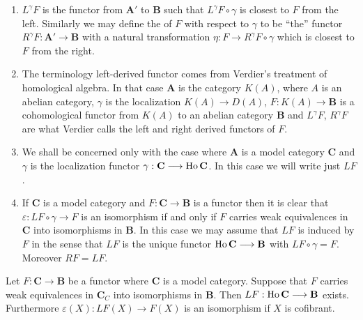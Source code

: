 \documentclass[../main]{subfiles}
\begin{document}
\begin{remark*}
\begin{enumerate}
\item $L^\gamma F$ is the functor from $\mathbf{A}'$ to $\mathbf{B}$ such that $L^\gamma F \circ \gamma$ is closest to $F$ from the left. Similarly we may define the  of $F$ with respect to $\gamma$ to be ``the'' functor $R^\gamma F : \mathbf{A}' \longrightarrow  \mathbf{B}$ with a natural transformation $\eta:F \longrightarrow  R^\gamma F \circ \gamma$ which is closest to $F$ from the right.
\item The terminology left-derived functor comes from Verdier's treatment of homological algebra\cite{verdier_categories_nodate}. In that case $\mathbf{A}$ is the category $K(A)$, where $A$ is an abelian category, $\gamma$ is the localization $K(A) \longrightarrow  D(A)$, $F: K(A)\longrightarrow  \mathbf{B}$ is a cohomological functor from $K(A)$ to an abelian category $\mathbf{B}$ and $L^\gamma F$, $R^\gamma F$ are what Verdier calls the left and right  derived functors of $F$.
\item We shall be concerned only with the case where $\mathbf{A}$ is a model category $\mathbf{C}$ and $\gamma$ is the localization functor $\gamma : \mathbf{C} \longrightarrow  \operatorname{Ho} \mathbf{C}$. In this case we will write just $LF$.
\item If $\mathbf{C}$ is a model category and $F:\mathbf{C} \longrightarrow  \mathbf{B}$ is a functor then it is clear that $\varepsilon : LF \circ \gamma \longrightarrow  F$ is an isomorphism if and only if $F$ carries weak equivalences in $\mathbf{C}$ into isomorphisms in $\mathbf{B}$. In this case we may assume that $LF$ is induced by $F$ in the sense that $LF$ is the unique functor $\operatorname{Ho} \mathbf{C}\longrightarrow  \mathbf{B} $ with $LF\circ \gamma = F$. Moreover $RF=LF$.
    

\end{enumerate}
\end{remark*}
\begin{proposition}
\label{prop:1.4.1}
Let $F:\mathbf{C} \longrightarrow  \mathbf{B}$ be a functor where $\mathbf{C}$ is a model category. Suppose that $F$ carries weak equivalences in $\mathbf{C}_C$ into isomorphisms in $\mathbf{B}$. Then $LF: \operatorname{Ho} \mathbf{C} \longrightarrow  \mathbf{B}$ exists. Furthermore $\varepsilon(X):LF(X)\longrightarrow  F(X)$ is an isomorphism if $X$ is cofibrant.
\end{proposition}
\end{document}
